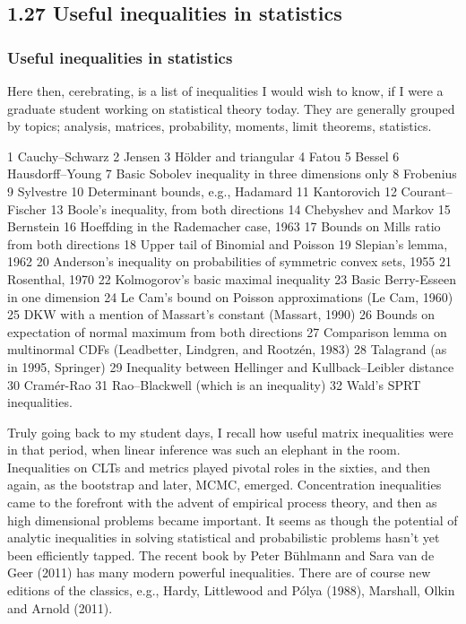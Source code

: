 \documentclass[11pt]{article}
\begin{document}
\subsection*{1.27 Useful inequalities in statistics}
\label{sec:orgheadline68}

\subsubsection*{Useful inequalities in statistics}
\label{sec:orgheadline66}
Here then, cerebrating, is a list of inequalities I would wish to know, if I
were a graduate student working on statistical theory today. They are generally
grouped by topics; analysis, matrices, probability, moments, limit theorems,
statistics.

1  Cauchy–Schwarz
2  Jensen
3  Hölder and triangular
4  Fatou
5  Bessel
6  Hausdorff–Young
7  Basic Sobolev inequality in three dimensions only
8  Frobenius
9  Sylvestre
10  Determinant bounds, e.g., Hadamard
11  Kantorovich
12  Courant–Fischer
13  Boole’s inequality, from both directions
14  Chebyshev and Markov
15  Bernstein
16  Hoeffding in the Rademacher case, 1963
17  Bounds on Mills ratio from both directions
18  Upper tail of Binomial and Poisson
19  Slepian’s lemma, 1962
20  Anderson’s inequality on probabilities of symmetric convex sets, 1955
21  Rosenthal, 1970
22  Kolmogorov’s basic maximal inequality
23  Basic Berry-Esseen in one dimension
24  Le Cam’s bound on Poisson approximations (Le Cam, 1960)
25  DKW with a mention of Massart’s constant (Massart, 1990)
26  Bounds on expectation of normal maximum from both directions
27  Comparison lemma on multinormal CDFs (Leadbetter, Lindgren, and Rootzén, 1983)
28  Talagrand (as in 1995, Springer)
29  Inequality between Hellinger and Kullback–Leibler distance
30  Cramér-Rao
31  Rao–Blackwell (which is an inequality)
32  Wald’s SPRT inequalities.

Truly going back to my student days, I recall how useful matrix inequalities
were in that period, when linear inference was such an elephant in the room.
Inequalities on CLTs and metrics played pivotal roles in the sixties, and then
again, as the bootstrap and later, MCMC, emerged. Concentration inequalities
came to the forefront with the advent of empirical process theory, and then as
high dimensional problems became important. It seems as though the potential of
analytic inequalities in solving statistical and probabilistic problems hasn’t
yet been efficiently tapped. The recent book by Peter Bühlmann and Sara van de
Geer (2011) has many modern powerful inequalities. There are of course new
editions of the classics, e.g., Hardy, Littlewood and Pólya (1988), Marshall,
Olkin and Arnold (2011).
\end{document}
